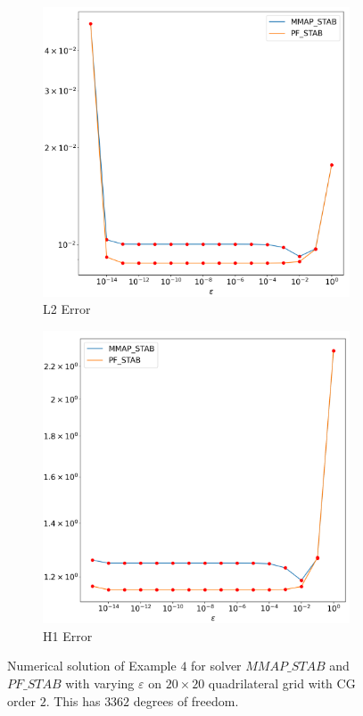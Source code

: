 \documentclass[12pt]{ociamthesis}
\begin{document}
\begin{figure}[H]
 \begin{subfigure}{0.5\textwidth}
     \includegraphics[width=\textwidth]{Pics/LHSims/E4/E4_STABL2.png}
     \caption{L2 Error}
 \end{subfigure}
   \begin{subfigure}{0.5\textwidth}
     \includegraphics[width=\textwidth]{Pics/LHSims/E4/E4_STABH1.png}
     \caption{H1 Error}
 \end{subfigure}
 \caption{Numerical solution of Example $4$ for solver $MMAP\_STAB$ and $PF\_STAB$ with varying $\varepsilon$ on $20 \times 20$ quadrilateral grid with CG order $2$. This has $3362$ degrees of freedom.} \label{E4_eps}
\end{figure}
\end{document}
